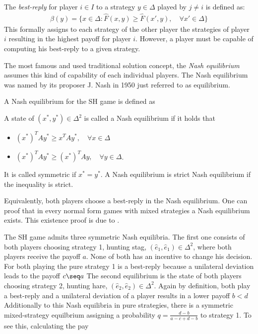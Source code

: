 \documentclass[12pt]{article}
\begin{document}
The \textit{best-reply} for player $i \in I$ to a strategy $y \in \Delta$ 
played by $j \neq i$ is defined as:
\begin{align}
        \beta(y) = \{x \in \Delta: \hat{F}(x,y) \geq \hat{F}(x',y), 
        \quad \forall x' \in \Delta\}
\end{align}
This formally assigns to each strategy of the other player the strategies
of player $i$ resulting in the highest payoff for player $i$. However, a player
must be capable of computing his best-reply to a given strategy.

The most famous and used traditional solution concept, the \textit{Nash 
equilibrium} assumes this kind of capability of each individual players. 
The Nash equilibrium was named by its proposer J. Nash in 1950 
just referred to as equilibrium.

A Nash equilibrium for the SH game is defined as
\begin{mydef}
        A state of $(x^*,y^*) \in \Delta^2$ is called a Nash equilibrium if 
        it holds that
\begin{itemize}
        \item   $(x^*)^T A y^* \geq x^T A y^*, \quad \forall x \in \Delta$
        \item   $(x^*)^T A y^* \geq (x^*)^T A y, \quad \forall y \in \Delta$.
\end{itemize}
It is called symmetric if $x^* = y^*$. A Nash equilibrium is 
strict Nash equilibrium if the inequality is strict.
\end{mydef}
Equivalently, both players choose a best-reply in the Nash equilibrium.
One can proof that in every normal form games with mixed 
strategies a Nash equilibrium exists. This existence proof is due to 
\textcite{nash_equilibrium_1950}.

The SH game admits three symmetric Nash equilibria. The first one consists
of both players choosing strategy 1, hunting stag, $(\hat{e}_1,\hat{e}_1) \in
\Delta^2$, where both players receive the payoff $a$. 
None of both has an incentive to change his decision. For both
playing the pure strategy 1 is a best-reply because a unilateral deviation 
leads to the payoff $c \seq a$
The second equilibrium is the state of 
both players choosing strategy 2, hunting hare, $(\hat{e}_2,\hat{e}_2)
\in \Delta^2$. Again by definition, both play a best-reply and a unilateral 
deviation of a player results in a lower payoff $b<d$
Additionally to this Nash equilibria in pure strategies, there is a symmetric
mixed-strategy equilbrium assigning a probability $q=\frac{d-b}{a-c+d-b}$ to
strategy 1. To see this, calculating the pay
\end{document}
